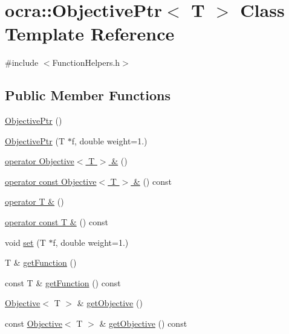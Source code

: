 \hypertarget{classocra_1_1ObjectivePtr}{}\section{ocra\+:\+:Objective\+Ptr$<$ T $>$ Class Template Reference}
\label{classocra_1_1ObjectivePtr}


{\ttfamily \#include $<$Function\+Helpers.\+h$>$}

\subsection*{Public Member Functions}
\begin{DoxyCompactItemize}
\item 
\hyperlink{classocra_1_1ObjectivePtr_ac82097858040b94f9beb50e038dd00d6}{Objective\+Ptr} ()
\item 
\hyperlink{classocra_1_1ObjectivePtr_ad8f830f8027859f3ac4daaf4e3bdc16f}{Objective\+Ptr} (T $\ast$f, double weight=1.)
\item 
\hyperlink{classocra_1_1ObjectivePtr_a9a4d3901e8ffabcce57254502858181c}{operator Objective$<$ T $>$ \&} ()
\item 
\hyperlink{classocra_1_1ObjectivePtr_adfab05ef2537b16ed6f98dc9ba56d644}{operator const Objective$<$ T $>$ \&} () const
\item 
\hyperlink{classocra_1_1ObjectivePtr_a5251323d60a6b6c841bb346cc164e37f}{operator T \&} ()
\item 
\hyperlink{classocra_1_1ObjectivePtr_a92dbd59e4c4383643df81e74fe267079}{operator const T \&} () const
\item 
void \hyperlink{classocra_1_1ObjectivePtr_aa65486dfbb8ccd72bfc629a06b967254}{set} (T $\ast$f, double weight=1.)
\item 
T \& \hyperlink{classocra_1_1ObjectivePtr_a8e8083b5a5583ec3fb24d002791ac1dd}{get\+Function} ()
\item 
const T \& \hyperlink{classocra_1_1ObjectivePtr_a3c73fca16c6d173bc6988957d72541a0}{get\+Function} () const
\item 
\hyperlink{classocra_1_1Objective}{Objective}$<$ T $>$ \& \hyperlink{classocra_1_1ObjectivePtr_a0069561ac9c93a92ff2e7156267550ce}{get\+Objective} ()
\item 
const \hyperlink{classocra_1_1Objective}{Objective}$<$ T $>$ \& \hyperlink{classocra_1_1ObjectivePtr_a6873607fc915a103ca5e6c3a7bc54764}{get\+Objective} () const
\end{DoxyCompactItemize}



